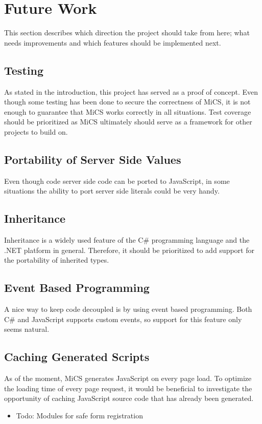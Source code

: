 
\section{Future Work}
\label{sec:futurework}
This section describes which direction the project should take from here; what needs improvements and which features should be implemented next.

\subsection{Testing} %
\label{sub:fw_testing}
	As stated in the introduction, this project has served as a proof of concept. Even though some testing has been done to secure the correctness of MiCS, it is not enough to guarantee that MiCS works correctly in all situations. Test coverage should be prioritized as MiCS ultimately should serve as a framework for other projects to build on.

\subsection{Portability of Server Side Values} %
\label{sub:portability_of_server_side_values}
	Even though code server side code can be ported to JavaScript, in some situations the ability to port server side literals could be very handy. 

\subsection{Inheritance} %
\label{sub:fw_inheritance}
	Inheritance is a widely used feature of the C\# programming language and the .NET platform in general. Therefore, it should be prioritized to add support for the portability of inherited types.

\subsection{Event Based Programming} %
\label{sub:fw_event_based_programming}
	A nice way to keep code decoupled is by using event based programming. Both C\# and JavaScript supports custom events, so support for this feature only seems natural.

\subsection{Caching Generated Scripts} %
\label{sub:fw_script_caching}
	As of the moment, MiCS generates JavaScript on every page load. To optimize the loading time of every page request, it would be beneficial to investigate the opportunity of caching JavaScript source code that has already been generated.

\begin{itemize}
	\item Todo: Modules for safe form registration
\end{itemize}